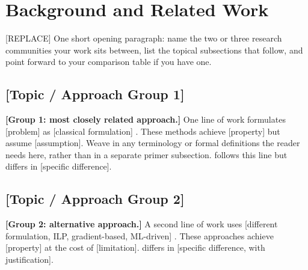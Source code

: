 \section{Background and Related Work}
\label{sec:background}
\label{sec:related}

%
%
%

[REPLACE] One short opening paragraph: name the two or three research
communities your work sits between, list the topical subsections that
follow, and point forward to your comparison table if you have one.

\subsection{[Topic / Approach Group 1]}
\label{sec:bg_group1}

\textbf{[Group 1: most closely related approach.]} One line of work
formulates [problem] as [classical formulation]
\cite{PLACEHOLDER_g1_a, PLACEHOLDER_g1_b, PLACEHOLDER_g1_c}. These
methods achieve [property] but assume [assumption]. Weave in any
terminology or formal definitions the reader needs here, rather than
in a separate primer subsection. \method{} follows this line but
differs in [specific difference].

\subsection{[Topic / Approach Group 2]}
\label{sec:bg_group2}

\textbf{[Group 2: alternative approach.]} A second line of work uses
[different formulation, \eg{} ILP, gradient-based, ML-driven]
\cite{PLACEHOLDER_g2_a, PLACEHOLDER_g2_b}. These approaches achieve
[property] at the cost of [limitation]. \method{} differs in
[specific difference, with justification].

